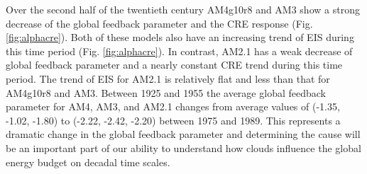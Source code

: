 \documentclass[grl]{agutex2015}
\begin{document}
\begin{article}
Over the second half of the twentieth century AM4g10r8 and AM3 show a strong decrease of the global feedback parameter and the CRE response (Fig. \ref{fig:alphacre}).  Both of these models also have an increasing trend of EIS during this time period (Fig. \ref{fig:alphacre}).  In contrast, AM2.1 has a weak decrease of global feedback parameter and a nearly constant CRE trend during this time period.  The trend of EIS for AM2.1 is relatively flat and less than that for AM4g10r8 and AM3.  
Between 1925 and 1955 the average global feedback parameter for AM4, AM3, and AM2.1 changes from average values of (-1.35, -1.02, -1.80) to (-2.22, -2.42, -2.20) between 1975 and 1989.  This represents a dramatic change in the global feedback parameter and determining the cause will be an important part of our ability to understand how clouds influence the global energy budget on decadal time scales. 




\end{article}
\end{document}
